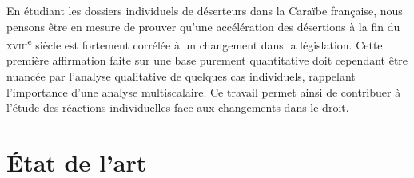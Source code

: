 \documentclass[final, fra]{anthology-ch}     %
\begin{document}
En étudiant les dossiers individuels de déserteurs dans la Caraïbe française, nous pensons être en mesure de prouver qu'une accélération des désertions à la fin du \textsc{xviii}\textsuperscript{e} siècle est fortement corrélée à un changement dans la législation. Cette première affirmation faite sur une base purement quantitative doit cependant être nuancée par l'analyse qualitative de quelques cas individuels, rappelant l'importance d'une analyse multiscalaire. Ce travail permet ainsi de contribuer à l'étude des réactions individuelles face aux changements dans le droit.


\section{État de l'art}
\end{document}
